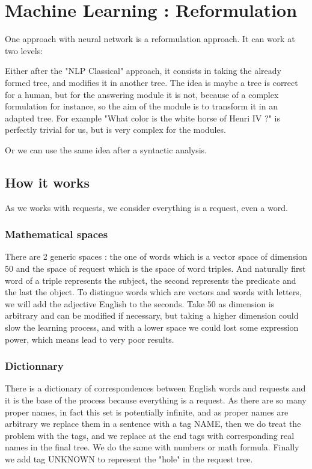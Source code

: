 \section{Machine Learning : Reformulation}

One approach with neural network is a reformulation approach. It can work at two levels: 

Either after the "NLP Classical" approach, it consists in taking the already formed tree, and modifies it in another tree. The idea is maybe a tree is correct for a human, but for the answering module it is not, because of a complex formulation for instance, so the aim of the module is to transform it in an adapted tree. For example "What color is the white horse of Henri IV ?" is perfectly trivial for us, but is very complex for the modules.

Or we can use the same idea after a syntactic analysis. 

\subsection{How it works}

As we works with requests, we consider everything is a request, even a word.

\subsubsection{Mathematical spaces}

There are 2 generic spaces : the one of words which is a vector space of dimension 50 and the space of request which is the space of word triples. And naturally first word of a triple represents the subject, the second represents the predicate and the last the object.
To distingue words which are vectors and words with letters, we will add the adjective English to the seconds.
Take 50 as dimension is arbitrary and can be modified if necessary, but taking a higher dimension could slow the learning process, and with a lower space we could lost some expression power, which means lead to very poor results.

\subsubsection{Dictionnary}

There is a dictionary of correspondences between English words and requests and it is the base of the process because everything is a request. As there are so many proper names, in fact this set is potentially infinite, and as proper names are arbitrary we replace them in a sentence with a tag NAME, then we do treat the problem with the tags, and we replace at the end tags with corresponding real names in the final tree. We do the same with numbers or math formula. Finally we add tag UNKNOWN to represent the "hole" in the request tree.

